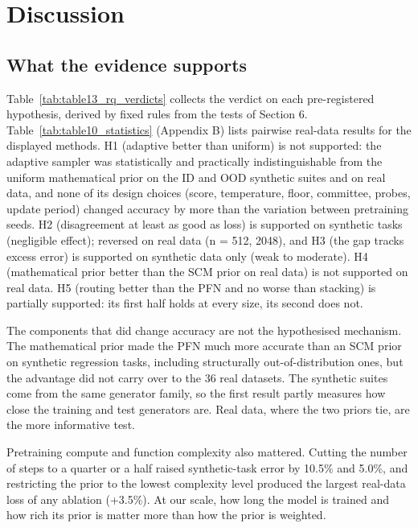\documentclass[mathematics,article,submit,pdftex,moreauthors]{Definitions/mdpi}
\begin{document}
\section{Discussion}

\subsection{What the evidence supports}

Table~\ref{tab:table13_rq_verdicts} collects the verdict on each pre-registered hypothesis, derived by fixed rules from the tests of Section 6. Table~\ref{tab:table10_statistics} (Appendix B) lists pairwise real-data results for the displayed methods. H1 (adaptive better than uniform) is not supported: the adaptive sampler was statistically and practically indistinguishable from the uniform mathematical prior on the ID and OOD synthetic suites and on real data, and none of its design choices (score, temperature, floor, committee, probes, update period) changed accuracy by more than the variation between pretraining seeds. H2 (disagreement at least as good as loss) is supported on synthetic tasks (negligible effect); reversed on real data (n = 512, 2048), and H3 (the gap tracks excess error) is supported on synthetic data only (weak to moderate). H4 (mathematical prior better than the SCM prior on real data) is not supported on real data. H5 (routing better than the PFN and no worse than stacking) is partially supported: its first half holds at every size, its second does not.



The components that did change accuracy are not the hypothesised mechanism. The mathematical prior made the PFN much more accurate than an SCM prior on synthetic regression tasks, including structurally out-of-distribution ones, but the advantage did not carry over to the 36 real datasets. The synthetic suites come from the same generator family, so the first result partly measures how close the training and test generators are. Real data, where the two priors tie, are the more informative test.

Pretraining compute and function complexity also mattered. Cutting the number of steps to a quarter or a half raised synthetic-task error by 10.5\% and 5.0\%, and restricting the prior to the lowest complexity level produced the largest real-data loss of any ablation (+3.5\%). At our scale, how long the model is trained and how rich its prior is matter more than how the prior is weighted.
\end{document}
